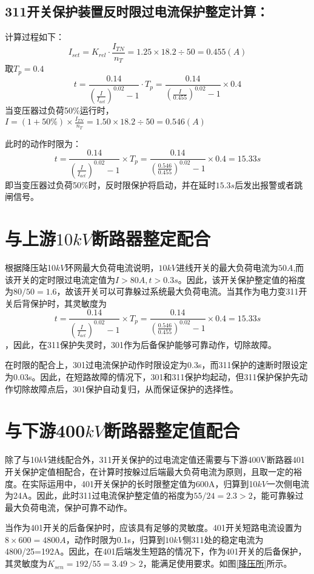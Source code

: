 \subsection{311开关保护装置反时限过电流保护整定计算：}
计算过程如下：
$$
I_{set}=K_{rel}\cdot \frac{I_{TN}}{n_T}=1.25\times 18.2\div 50=0.455\left( A \right) 
$$
取$T_{p}=0.4$
$$
t=\frac{0.14}{\left( \frac{I}{I_{act}} \right) ^{0.02}-1}\cdot T_p=\frac{0.14}{\left( \frac{{I}}{0.455} \right) ^{0.02}-1}\times 0.4
$$
当变压器过负荷50\%运行时，$I=\left( 1+50\% \right) \times \frac{I_{TN}}{n_T}=1.50\times 18.2\div 50=0.546\left( A \right) $\par 
此时的动作时限为：$$
t=\frac{0.14}{\left( \frac{I}{I_{act}} \right) ^{0.02}-1}\times T_p=\frac{0.14}{\left( \frac{0.546}{0.455} \right) ^{0.02}-1}\times 0.4=15.33s
$$
即当变压器过负荷50\%时，反时限保护将启动，并在延时$15.3s$后发出报警或者跳闸信号。
\section{与上游$10kV$断路器整定配合}
根据降压站10$kV$环网最大负荷电流说明，$10kV$进线开关的最大负荷电流为$50A$,而该开关的定时限过电流定值为$I>80A,t>0.3s$。因此，该开关保护整定值的裕度为$80/50=1.6$，故该开关可以可靠躲过系统最大负荷电流。当其作为电力变311开关后背保护时，其灵敏度为$$t=\frac{0.14}{\left( \frac{I}{I_{act}} \right) ^{0.02}-1}\times T_p=\frac{0.14}{\left( \frac{0.546}{0.455} \right) ^{0.02}-1}\times 0.4=15.33s
$$，因此，在311保护失灵时，301作为后备保护能够可靠动作，切除故障。\par 
在时限的配合上，301过电流保护动作时限设定为0.3s，而311保护的速断时限设定为0.03s。因此，在短路故障的情况下，301和311保护均起动，但311保护保护先动作切除故障点后，301保护自动复归，从而保证保护的选择性。
\section{与下游400$kV$断路器整定值配合}
除了与10$kV$进线配合外，311开关保护的过电流定值还需要与下游400V断路器401开关保护定值相配合，在计算时按躲过后端最大负荷电流为原则，且取一定的裕度。在实际运用中，401开关保护的长时限整定值为600A，归算到10$kV$一次侧电流为24A。因此，此时311过电流保护整定值的裕度为$55/24=2.3>2$，能可靠躲过最大负荷电流，保护可靠不动作。\par 
当作为401开关的后备保护时，应该具有足够的灵敏度。401开关短路电流设置为$8\times600=4800A$，动作时限为0.1s，归算到$10kV$侧311处的稳定电流为4800/25=192A。因此，在401后端发生短路的情况下，作为401开关的后备保护，其灵敏度为$K_{sen}=192/55=3.49>2$，能满足使用要求。如图\ref{降压所}所示。
\addtocounter{page}{-1}